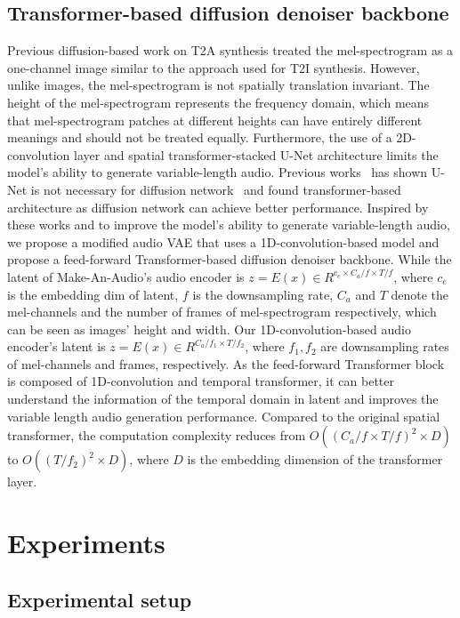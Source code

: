 \documentclass{article}
\begin{document}
\subsection{Transformer-based diffusion denoiser backbone}
\label{FFT}
Previous diffusion-based work on T2A synthesis treated the mel-spectrogram as a one-channel image similar to the approach used for T2I synthesis. However, unlike images, the mel-spectrogram is not spatially translation invariant. The height of the mel-spectrogram represents the frequency domain, which means that mel-spectrogram patches at different heights can have entirely different meanings and should not be treated equally. Furthermore, the use of a 2D-convolution layer and spatial transformer-stacked U-Net architecture limits the model's ability to generate variable-length audio. Previous works~\cite{dit,uvit} has shown U-Net is not necessary for diffusion network~\cite{ho2020denoising,rombach2022high} and found transformer-based~\cite{vaswani2017attention} architecture as diffusion network can achieve better performance. Inspired by these works and to improve the model's ability to generate variable-length audio, we propose a modified audio VAE that uses a 1D-convolution-based model and propose a feed-forward Transformer-based diffusion denoiser backbone. While the latent of Make-An-Audio's audio encoder is $z=E(x)\in R^{c_e\times C_a/f\times T/f}$, where $c_e$ is the embedding dim of latent, $f$ is the downsampling rate, $C_a$ and $T$ denote the mel-channels and the number of frames of mel-spectrogram respectively, which can be seen as images' height and width. Our 1D-convolution-based audio encoder's latent is  $z=E(x)\in R^{C_a/f_1\times T/f_2}$, where $f_1,f_2$ are downsampling rates of mel-channels and frames, respectively. 
As the feed-forward Transformer block is composed of 1D-convolution and temporal transformer, it can better understand the information of the temporal domain in latent and improves the variable length audio generation performance. Compared to the original spatial transformer, the computation complexity reduces from $O((C_a/f \times T/f)^2 \times D)$ to $O((T/f_2)^2 \times D)$, where $D$ is the embedding dimension of the transformer layer. 





 \section{Experiments}

\subsection{Experimental setup}
\end{document}
